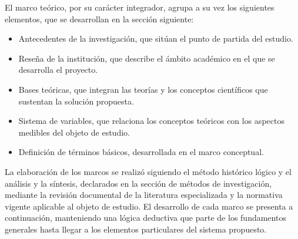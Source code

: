 El marco te\'orico, por su car\'acter integrador, agrupa a su vez los siguientes
elementos, que se desarrollan en la secci\'on siguiente:

\begin{itemize}
  \item Antecedentes de la investigaci\'on, que sit\'uan el punto de partida
    del estudio.
  \item Rese\~na de la instituci\'on, que describe el \'ambito acad\'emico en el
    que se desarrolla el proyecto.
  \item Bases te\'oricas, que integran las teor\'ias y los conceptos
    cient\'ificos que sustentan la soluci\'on propuesta.
  \item Sistema de variables, que relaciona los conceptos te\'oricos con los
    aspectos medibles del objeto de estudio.
  \item Definici\'on de t\'erminos b\'asicos, desarrollada en el marco
    conceptual.
\end{itemize}

La elaboraci\'on de los marcos se realiz\'o siguiendo el m\'etodo hist\'orico
l\'ogico y el an\'alisis y la s\'intesis, declarados en la secci\'on de m\'etodos
de investigaci\'on, mediante la revisi\'on documental de la literatura
especializada y la normativa vigente aplicable al objeto de estudio. El
desarrollo de cada marco se presenta a continuaci\'on, manteniendo una l\'ogica
deductiva que parte de los fundamentos generales hasta llegar a los elementos
particulares del sistema propuesto.
